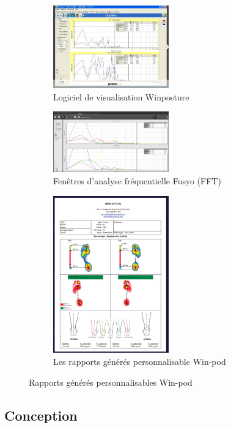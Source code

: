 \begin{figure}[H]
    \centering
    \begin{subfigure}[b]{0.45\textwidth}
      \centering
      \includegraphics[width=5cm]{images/pression_plantaire/winposture2.png}
    \caption{Logiciel de visualisation Winposture}\label{fig: Logiciel Winposture}
    \end{subfigure}
    \begin{subfigure}[b]{0.45\textwidth}
      \centering
      \includegraphics[width=5cm]{images/analyse_marche/FFT.png}
      \caption{Fenêtres d’analyse fréquentielle Fusyo (FFT)}\label{fig:FFT}
    \end{subfigure}
    \begin{subfigure}[b]{0.45\textwidth}
      \centering
      \includegraphics[width=5cm]{images/analyse_marche/WinPod4.png}
    \caption{Les rapports générés personnalisable Win-pod}\label{fig:WinPod4}
    \end{subfigure}
    \caption{Rapports générés personnalisables Win-pod}\label{fig:global2}
\end{figure}


\subsection{Conception}

